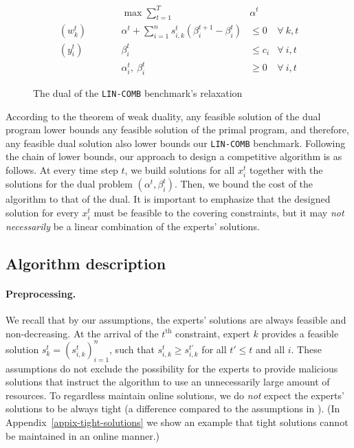 \begin{figure}
	\begin{mdframed}
	\vspace{-10pt}
		\begin{align*}
			&& \max \sum_{t=1}^{T} & \alpha^{t} \\
			(w_{k}^{t}) \qquad && \alpha^{t} + \sum_{i=1}^{n} s_{i,k}^{t} ( \beta_{i}^{t+1} - \beta_{i}^{t})   &\leq 0  &\forall\ k,t\\
			(y_{i}^{t}) \qquad && \beta_{i}^{t}   &\leq c_{i}  &\forall\ i,t \\
			&& \alpha_{i}^{t},\ \beta_{i}^{t} & \ge 0 & \forall\ i,t
		\end{align*}
	\end{mdframed}
	\caption{The dual of the \texttt{LIN-COMB} benchmark's relaxation}
	\label{fig:dual}
	\vspace{-5pt}
\end{figure}


According to the theorem of weak duality, any feasible solution of the dual program lower bounds any feasible solution of the primal program, and therefore, any feasible dual solution also lower bounds our \texttt{LIN-COMB} benchmark. Following the chain of lower bounds, our approach to design a competitive algorithm is as follows. At every time step $t$, we build solutions for all $x_{i}^{t}$ together with the solutions for the dual problem $(\alpha^{t}, \beta_{i}^{t})$. Then, we bound the cost of the algorithm to that of the dual. It is important to emphasize that the designed solution for every $x_{i}^{t}$ must be feasible to the covering constraints, but it may \emph{not necessarily} be a linear combination of the experts' solutions.

\subsection{Algorithm description} \label{sec:algo}

\paragraph{Preprocessing.}
We recall that by our assumptions, the experts' solutions are always feasible and non-decreasing. At the arrival of the $t^{\text{th}}$ constraint, expert $k$ provides a feasible solution $s_{k}^{t} = (s_{i,k}^{t})_{i=1}^{n}$, such that $s_{i,k}^{t} \ge s_{i,k}^{t'}$ for all $t' \le t$ and all $i$. These assumptions do not exclude the possibility for the experts to provide malicious solutions that instruct the algorithm to use an unnecessarily large amount of resources.
To regardless maintain online solutions, we do \emph{not} expect the experts' solutions to be always tight (a difference compared to the assumptions in \cite{AnandGe22:Online-Algorithms}).
(In Appendix~\ref{appix-tight-solutions}
we show an example that tight solutions cannot be maintained in an online manner.)

